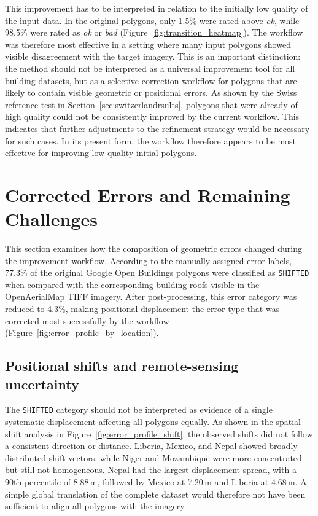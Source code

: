 This improvement has to be interpreted in relation to the initially low quality of the input data. In the original polygons, only 1.5\% were rated above \textit{ok}, while 98.5\% were rated as \textit{ok} or \textit{bad} (Figure~\ref{fig:transition_heatmap}). The workflow was therefore most effective in a setting where many input polygons showed visible disagreement with the target imagery. This is an important distinction: the method should not be interpreted as a universal improvement tool for all building datasets, but as a selective correction workflow for polygons that are likely to contain visible geometric or positional errors. As shown by the Swiss reference test in Section~\ref{sec:switzerlandrsults}, polygons that were already of high quality could not be consistently improved by the current workflow. This indicates that further adjustments to the refinement strategy would be necessary for such cases. In its present form, the workflow therefore appears to be most effective for improving low-quality initial polygons.


\section{Corrected Errors and Remaining Challenges}

This section examines how the composition of geometric errors changed during the improvement workflow. According to the manually assigned error labels, 77.3\% of the original Google Open Buildings polygons were classified as \texttt{SHIFTED} when compared with the corresponding building roofs visible in the OpenAerialMap TIFF imagery. After post-processing, this error category was reduced to 4.3\%, making positional displacement the error type that was corrected most successfully by the workflow (Figure~\ref{fig:error_profile_by_location}).

\subsection{Positional shifts and remote-sensing uncertainty}

The \texttt{SHIFTED} category should not be interpreted as evidence of a single systematic displacement affecting all polygons equally. As shown in the spatial shift analysis in Figure~\ref{fig:error_profile_shift}, the observed shifts did not follow a consistent direction or distance. Liberia, Mexico, and Nepal showed broadly distributed shift vectors, while Niger and Mozambique were more concentrated but still not homogeneous. Nepal had the largest displacement spread, with a 90th percentile of 8.88\,m, followed by Mexico at 7.20\,m and Liberia at 4.68\,m. A simple global translation of the complete dataset would therefore not have been sufficient to align all polygons with the imagery.


